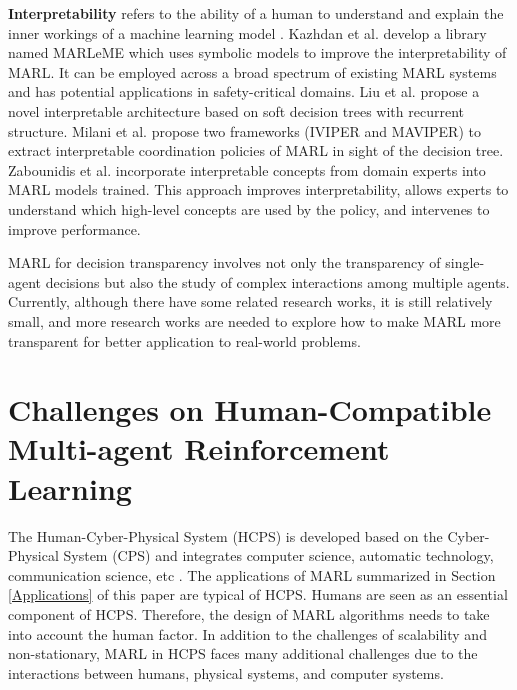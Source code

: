 \documentclass[acmsmall]{acmart}
\begin{document}
\textbf{Interpretability} refers to the ability of a human to understand and explain the inner workings of a machine learning model \cite{10.1007/978-3-030-57321-8_5,10.1145/3527448}.
Kazhdan et al. \cite{9207564} develop a library named MARLeME which uses symbolic models to improve the interpretability of MARL. It can be employed across a broad spectrum of existing MARL systems and has potential applications in safety-critical domains.
Liu et al. \cite{liu2022mixrts} propose a novel interpretable architecture based on soft decision trees with recurrent structure. 
Milani et al. \cite{10.1007/978-3-031-26412-2_16} propose two frameworks (IVIPER and MAVIPER) to extract interpretable coordination policies of MARL in sight of the decision tree. 
Zabounidis et al. \cite{pmlr-v205-zabounidis23a} incorporate interpretable concepts from domain experts into MARL models trained. This approach improves interpretability, allows experts to understand which high-level concepts are used by the policy, and intervenes to improve performance.

MARL for decision transparency involves not only the transparency of single-agent decisions but also the study of complex interactions among multiple agents. Currently, although there have some related research works, it is still relatively small, and more research works are needed to explore how to make MARL more transparent for better application to real-world problems.

\section{Challenges on Human-Compatible Multi-agent Reinforcement Learning} \label{Challenges}
The Human-Cyber-Physical System (HCPS) is developed based on the Cyber-Physical System (CPS) and integrates computer science, automatic technology, communication science, etc \cite{hcps,liuhcps}. The applications of MARL summarized in Section \ref{Applications} of this paper are typical of HCPS.
Humans are seen as an essential component of HCPS. Therefore, the design of MARL algorithms needs to take into account the human factor.
In addition to the challenges of scalability and non-stationary, MARL in HCPS faces many additional challenges due to the interactions between humans, physical systems, and computer systems. 
\end{document}
